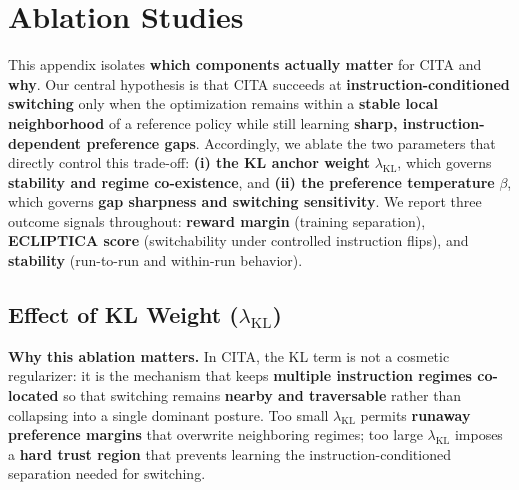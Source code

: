 \section{Ablation Studies}
\label{sec:appendix_ablations}

\vspace{-0.25em}
\noindent
This appendix isolates \textbf{which components actually matter} for \textsc{CITA} and \textbf{why}.
Our central hypothesis is that \textsc{CITA} succeeds at \textbf{instruction-conditioned switching} only when the optimization remains within a \textbf{stable local neighborhood} of a reference policy while still learning \textbf{sharp, instruction-dependent preference gaps}.
Accordingly, we ablate the two parameters that directly control this trade-off:
\textbf{(i) the KL anchor weight} $\lambda_{\text{KL}}$, which governs \textbf{stability and regime co-existence}, and
\textbf{(ii) the preference temperature} $\beta$, which governs \textbf{gap sharpness and switching sensitivity}.
We report three outcome signals throughout:
\textbf{reward margin} (training separation), \textbf{ECLIPTICA score} (switchability under controlled instruction flips), and \textbf{stability} (run-to-run and within-run behavior).

\subsection{Effect of KL Weight ($\lambda_{\text{KL}}$)}

\vspace{-0.25em}
\noindent
\textbf{Why this ablation matters.}
In \textsc{CITA}, the KL term is not a cosmetic regularizer: it is the mechanism that keeps \textbf{multiple instruction regimes co-located} so that switching remains \textbf{nearby and traversable} rather than collapsing into a single dominant posture.
Too small $\lambda_{\text{KL}}$ permits \textbf{runaway preference margins} that overwrite neighboring regimes; too large $\lambda_{\text{KL}}$ imposes a \textbf{hard trust region} that prevents learning the instruction-conditioned separation needed for switching.

